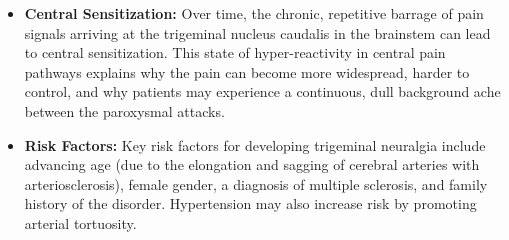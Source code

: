 \begin{itemize}
  \item \textbf{Central Sensitization:} Over time, the chronic, repetitive barrage of pain signals arriving at the trigeminal nucleus caudalis in the brainstem can lead to central sensitization. This state of hyper-reactivity in central pain pathways explains why the pain can become more widespread, harder to control, and why patients may experience a continuous, dull background ache between the paroxysmal attacks.
  \item \textbf{Risk Factors:} Key risk factors for developing trigeminal neuralgia include advancing age (due to the elongation and sagging of cerebral arteries with arteriosclerosis), female gender, a diagnosis of multiple sclerosis, and family history of the disorder. Hypertension may also increase risk by promoting arterial tortuosity.
\end{itemize}

